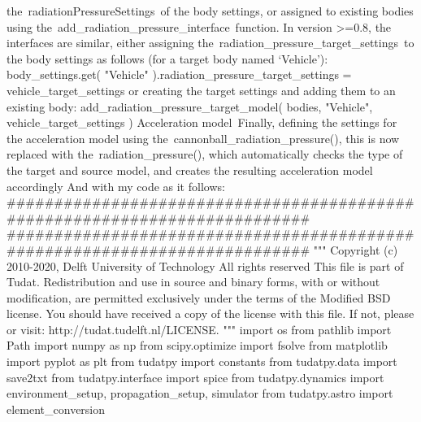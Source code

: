 the radiationPressureSettings of the body settings, or assigned to existing bodies using the add_radiation_pressure_interface function. In version >=0.8, the interfaces are similar, either assigning the radiation_pressure_target_settings to the body settings as follows (for a target body named ‘Vehicle’): body_settings.get( "Vehicle" ).radiation_pressure_target_settings = vehicle_target_settings or creating the target settings and adding them to an existing body: add_radiation_pressure_target_model( bodies, "Vehicle", vehicle_target_settings ) Acceleration model Finally, defining the settings for the acceleration model using the cannonball_radiation_pressure(), this is now replaced with the radiation_pressure(), which automatically checks the type of the target and source model, and creates the resulting acceleration model accordingly And with my code as it follows:\markdownRendererInterblockSeparator
{}###########################################################################\markdownRendererInterblockSeparator
{}
\markdownRendererSectionEnd 
\markdownRendererSectionEnd \markdownRendererSectionBegin
\markdownRendererHeadingOne{}\markdownRendererInterblockSeparator
{}
\markdownRendererSectionEnd \markdownRendererSectionBegin
{}\markdownRendererInterblockSeparator
{}
\markdownRendererSectionEnd \markdownRendererSectionBegin
\markdownRendererHeadingOne{}\markdownRendererInterblockSeparator
{}
\markdownRendererSectionEnd \markdownRendererSectionBegin
{}\markdownRendererInterblockSeparator
{}
\markdownRendererSectionEnd \markdownRendererSectionBegin
\markdownRendererHeadingOne{}\markdownRendererInterblockSeparator
{}########################################################################### """ Copyright (c) 2010-2020, Delft University of Technology All rights reserved This file is part of Tudat. Redistribution and use in source and binary forms, with or without modification, are permitted exclusively under the terms of the Modified BSD license. You should have received a copy of the license with this file. If not, please or visit: http://tudat.tudelft.nl/LICENSE. """ import os from pathlib import Path import numpy as np from scipy.optimize import fsolve from matplotlib import pyplot as plt from tudatpy import constants from tudatpy.data import save2txt from tudatpy.interface import spice from tudatpy.dynamics import environment_setup, propagation_setup, simulator from tudatpy.astro import element_conversion\markdownRendererInterblockSeparator
